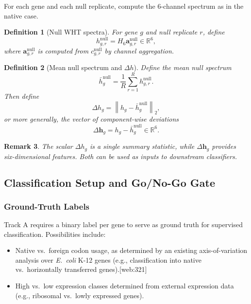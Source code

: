 \documentclass[11pt]{article}
\newtheorem{definition}{Definition}[section]
\newtheorem{remark}[definition]{Remark}
\newcommand{\R}{\mathbb{R}}
\newcommand{\vect}[1]{\bm{#1}}
\newcommand{\norm}[1]{\left\lVert #1 \right\rVert}
\begin{document}
For each gene and each null replicate, compute the 6-channel spectrum as in the native case.

\begin{definition}[Null WHT spectra]
For gene \(g\) and null replicate \(r\), define
\[
  h_{g,r}^{\mathrm{null}} = H_6 \vect{a}_{g,r}^{\mathrm{null}} \in \R^6,
\]
where \(\vect{a}_{g,r}^{\mathrm{null}}\) is computed from \(c_{g,r}^{\mathrm{null}}\) by channel aggregation.
\end{definition}

\begin{definition}[Mean null spectrum and \(\Delta h\)]
Define the mean null spectrum
\[
  \bar{h}_g^{\mathrm{null}} = \frac{1}{R} \sum_{r=1}^R h_{g,r}^{\mathrm{null}}.
\]
Then define
\[
  \Delta h_g = \norm{h_g - \bar{h}_g^{\mathrm{null}}}_2,
\]
or more generally, the vector of component-wise deviations
\[
  \Delta \vect{h}_g = h_g - \bar{h}_g^{\mathrm{null}} \in \R^6.
\]
\end{definition}

\begin{remark}
The scalar \(\Delta h_g\) is a single summary statistic, while \(\Delta \vect{h}_g\) provides six-dimensional features.
Both can be used as inputs to downstream classifiers.
\end{remark}

\subsection{Classification Setup and Go/No-Go Gate}

\subsubsection{Ground-Truth Labels}

Track A requires a binary label per gene to serve as ground truth for supervised classification.
Possibilities include:
\begin{itemize}[leftmargin=1.8em]
  \item Native vs.\ foreign codon usage, as determined by an existing axis-of-variation analysis over \emph{E.~coli} K-12 genes (e.g., classification into native vs.\ horizontally transferred genes).[web:321]
  \item High vs.\ low expression classes determined from external expression data (e.g., ribosomal vs.\ lowly expressed genes).
\end{itemize}
\end{document}
